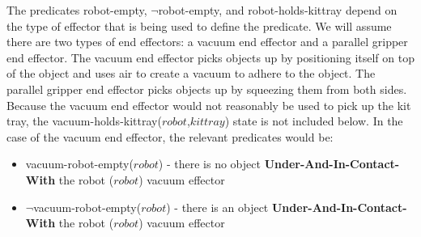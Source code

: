 \documentclass[preprint,12pt]{elsarticle}
\newcommand{\const}[1] {$\mathit{#1}$}
\newcommand{\stvar}[1] {\textsf{#1}}
\begin{document}
The predicates \stvar{robot-empty}, $\neg$\stvar{robot-empty}, and \stvar{robot-holds-kittray} depend on the type of effector that is being used to define the predicate. We will assume there are two types of end effectors: a vacuum end effector and a parallel gripper end effector. The vacuum end effector picks objects up by positioning itself on top of the object and uses air to create a vacuum to adhere to the object. The parallel gripper end effector picks objects up by squeezing them from both sides.  Because the vacuum end effector would not reasonably be used to pick up the kit tray, the \stvar{vacuum-holds-kittray}(\const{robot},\const{kittray}) state is not included below. In the case of the vacuum end effector, the relevant predicates would be:


\begin{itemize}
\item \stvar{vacuum-robot-empty}(\const{robot}) - there is no object \textbf{Under-And-In-Contact-With} the robot (\const{robot}) vacuum effector
\item $\neg$\stvar{vacuum-robot-empty}(\const{robot}) - there is an object \textbf{Under-And-In-Contact-With} the robot (\const{robot}) vacuum effector
\end{itemize}
\end{document}
